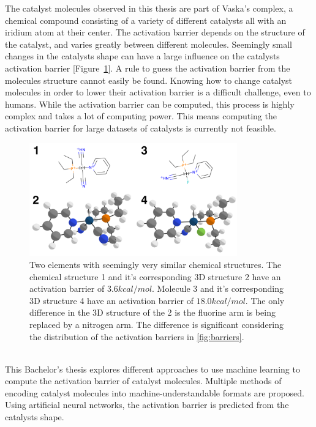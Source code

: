 The catalyst molecules observed in this thesis are part of Vaska's complex, a chemical compound consisting of a variety of different catalysts all with an iridium atom at their center.
The activation barrier depends on the structure of the catalyst, and varies greatly between different molecules.
Seemingly small changes in the catalysts shape can have a large influence on the catalysts activation barrier [Figure~\ref{fig:struct-diff}].
A rule to guess the activation barrier from the molecules structure cannot easily be found.  
Knowing how to change catalyst molecules in order to lower their activation barrier is a difficult challenge, even to humans.
While the activation barrier can be computed, this process is highly complex and takes a lot of computing power.
This means computing the activation barrier for large datasets of catalysts is currently not feasible.
\begin{figure}[hb!]
  \centering
  \includegraphics[width=0.8\textwidth]{figures/introduction/elems_intro.png}
  \caption[Example of catalyst molecules]{Two elements with seemingly very similar chemical structures. The chemical structure 1 and it's corresponding 3D structure 2 have an activation barrier of $3.6 kcal/mol$.
  Molecule 3 and it's corresponding 3D structure 4 have an activation barrier of $18.0 kcal/mol$.
  The only difference in the 3D structure of the 2 is the fluorine arm is being replaced by a nitrogen arm.
  The difference is significant considering the distribution of the activation barriers in \ref{fig:barriers}.  }
  \label{fig:struct-diff}
\end{figure}
\\
This Bachelor's thesis explores different approaches to use machine learning to compute the activation barrier of catalyst molecules.
Multiple methods of encoding catalyst molecules into machine-understandable formats are proposed.
Using artificial neural networks, the activation barrier is predicted from the catalysts shape.

